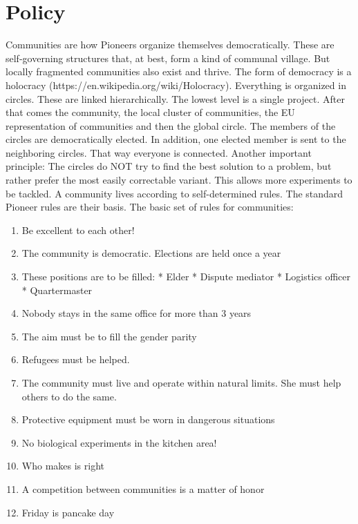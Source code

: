 \section{Policy}
Communities are how Pioneers organize themselves democratically. These are self-governing structures that, at best, form a kind of communal village. But locally fragmented communities also exist and thrive. The form of democracy is a holocracy (https://en.wikipedia.org/wiki/Holocracy). Everything is organized in circles. These are linked hierarchically. The lowest level is a single project. After that comes the community, the local cluster of communities, the EU
representation of communities and then the global circle.
The members of the circles are democratically elected. In addition, one elected member is sent to the neighboring circles. That way everyone is connected. Another important principle: The circles do NOT try to find the best solution to a problem, but rather prefer the most easily correctable variant. This allows more experiments to be tackled.
A community lives according to self-determined rules. The standard Pioneer rules are their basis.
The basic set of rules for communities:
\begin{enumerate}
    \item Be excellent to each other!
    \item The community is democratic. Elections are held once a year
    \item These positions are to be filled: * Elder * Dispute mediator * Logistics officer * Quartermaster
    \item Nobody stays in the same office for more than 3 years
    \item The aim must be to fill the gender parity
    \item Refugees must be helped.
    \item The community must live and operate within natural limits. She must help others to do the same.
    \item Protective equipment must be worn in dangerous situations
    \item No biological experiments in the kitchen area!
    \item Who makes is right
    \item A competition between communities is a matter of honor
    \item Friday is pancake day
\end{enumerate}


